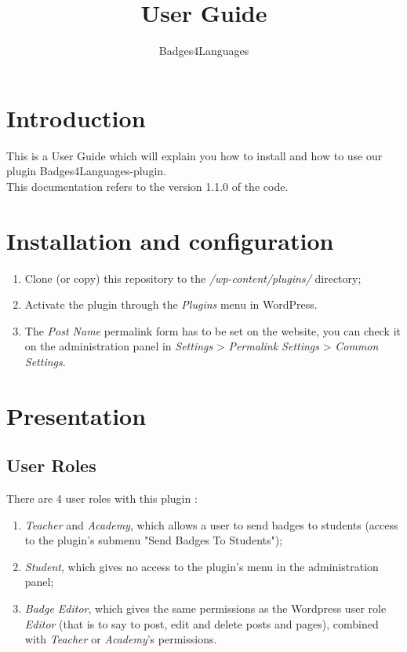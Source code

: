 \documentclass[a4paper, 12pt]{report}
\title{User Guide}
\author{Badges4Languages}
\begin{document}
\maketitle


\newpage
\thispagestyle{empty}
\hfill
\newpage
\addtocounter{page}{-1}

\newpage
	\setcounter{page}{1}
	\tableofcontents
	
	
\newpage
	\chapter*{Introduction}
	
	This is a User Guide which will explain you how to install and how to use our plugin Badges4Languages-plugin.\\
	
	This documentation refers to the version 1.1.0 of the code.
	





	\chapter{Installation and configuration}

	\begin{enumerate}
		\item Clone (or copy) this repository to the \textit{/wp-content/plugins/} directory;
    	\item Activate the plugin through the \textit{Plugins} menu in WordPress.
    	\item The \textit{Post Name} permalink form has to be set on the website, you can check it on the administration panel in \textit{Settings} > \textit{Permalink Settings} > \textit{Common Settings}.
	\end{enumerate}
	
	
	
	
	
	
	\chapter{Presentation}
	
		\section{User Roles}
		
		There are 4 user roles with this plugin :
	\begin{enumerate}
		\item \textit{Teacher} and \textit{Academy}, which allows a user to send badges to students (access to the plugin's submenu "Send Badges To Students");
		\item \textit{Student}, which gives no access to the plugin's menu in the administration panel;
    	\item \textit{Badge Editor}, which gives the same permissions as the Wordpress user role \textit{Editor} (that is to say to post, edit and delete posts and pages), combined with \textit{Teacher} or \textit{Academy}'s permissions.
	\end{enumerate}
	
\end{document}
